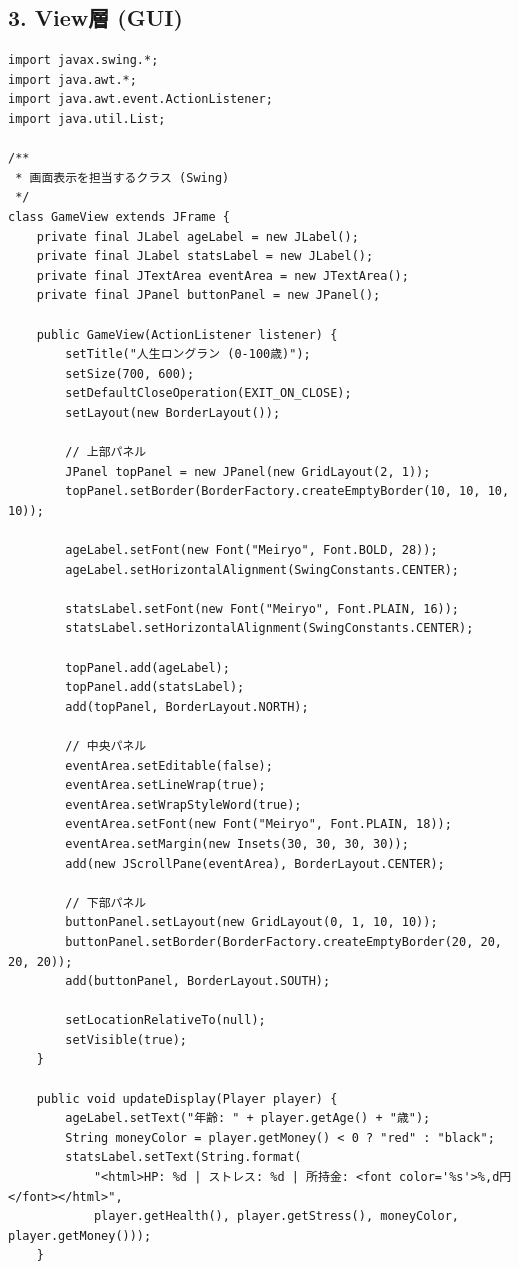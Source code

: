 \documentclass[a4paper,11pt]{jsarticle}
\begin{document}
\subsection*{3. View層 (GUI)}
\begin{lstlisting}[caption=GameView.java]
import javax.swing.*;
import java.awt.*;
import java.awt.event.ActionListener;
import java.util.List;

/**
 * 画面表示を担当するクラス (Swing)
 */
class GameView extends JFrame {
    private final JLabel ageLabel = new JLabel();
    private final JLabel statsLabel = new JLabel(); 
    private final JTextArea eventArea = new JTextArea();
    private final JPanel buttonPanel = new JPanel();

    public GameView(ActionListener listener) {
        setTitle("人生ロングラン (0-100歳)");
        setSize(700, 600);
        setDefaultCloseOperation(EXIT_ON_CLOSE);
        setLayout(new BorderLayout());

        // 上部パネル
        JPanel topPanel = new JPanel(new GridLayout(2, 1));
        topPanel.setBorder(BorderFactory.createEmptyBorder(10, 10, 10, 10));
        
        ageLabel.setFont(new Font("Meiryo", Font.BOLD, 28));
        ageLabel.setHorizontalAlignment(SwingConstants.CENTER);
        
        statsLabel.setFont(new Font("Meiryo", Font.PLAIN, 16));
        statsLabel.setHorizontalAlignment(SwingConstants.CENTER);

        topPanel.add(ageLabel);
        topPanel.add(statsLabel);
        add(topPanel, BorderLayout.NORTH);

        // 中央パネル
        eventArea.setEditable(false);
        eventArea.setLineWrap(true);
        eventArea.setWrapStyleWord(true);
        eventArea.setFont(new Font("Meiryo", Font.PLAIN, 18));
        eventArea.setMargin(new Insets(30, 30, 30, 30));
        add(new JScrollPane(eventArea), BorderLayout.CENTER);

        // 下部パネル
        buttonPanel.setLayout(new GridLayout(0, 1, 10, 10));
        buttonPanel.setBorder(BorderFactory.createEmptyBorder(20, 20, 20, 20));
        add(buttonPanel, BorderLayout.SOUTH);

        setLocationRelativeTo(null);
        setVisible(true);
    }

    public void updateDisplay(Player player) {
        ageLabel.setText("年齢: " + player.getAge() + "歳");
        String moneyColor = player.getMoney() < 0 ? "red" : "black";
        statsLabel.setText(String.format(
            "<html>HP: %d | ストレス: %d | 所持金: <font color='%s'>%,d円</font></html>", 
            player.getHealth(), player.getStress(), moneyColor, player.getMoney()));
    }


\end{lstlisting}
\end{document}
